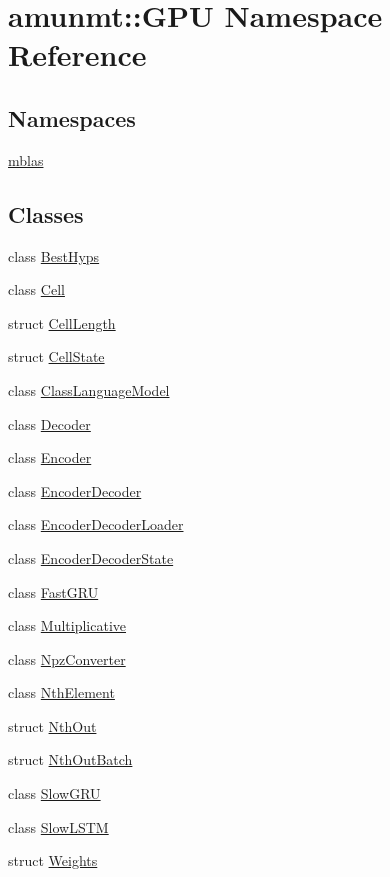 \hypertarget{namespaceamunmt_1_1GPU}{}\section{amunmt\+:\+:G\+PU Namespace Reference}
\label{namespaceamunmt_1_1GPU}
\subsection*{Namespaces}
\begin{DoxyCompactItemize}
\item 
 \hyperlink{namespaceamunmt_1_1GPU_1_1mblas}{mblas}
\end{DoxyCompactItemize}
\subsection*{Classes}
\begin{DoxyCompactItemize}
\item 
class \hyperlink{classamunmt_1_1GPU_1_1BestHyps}{Best\+Hyps}
\item 
class \hyperlink{classamunmt_1_1GPU_1_1Cell}{Cell}
\item 
struct \hyperlink{structamunmt_1_1GPU_1_1CellLength}{Cell\+Length}
\item 
struct \hyperlink{structamunmt_1_1GPU_1_1CellState}{Cell\+State}
\item 
class \hyperlink{classamunmt_1_1GPU_1_1ClassLanguageModel}{Class\+Language\+Model}
\item 
class \hyperlink{classamunmt_1_1GPU_1_1Decoder}{Decoder}
\item 
class \hyperlink{classamunmt_1_1GPU_1_1Encoder}{Encoder}
\item 
class \hyperlink{classamunmt_1_1GPU_1_1EncoderDecoder}{Encoder\+Decoder}
\item 
class \hyperlink{classamunmt_1_1GPU_1_1EncoderDecoderLoader}{Encoder\+Decoder\+Loader}
\item 
class \hyperlink{classamunmt_1_1GPU_1_1EncoderDecoderState}{Encoder\+Decoder\+State}
\item 
class \hyperlink{classamunmt_1_1GPU_1_1FastGRU}{Fast\+G\+RU}
\item 
class \hyperlink{classamunmt_1_1GPU_1_1Multiplicative}{Multiplicative}
\item 
class \hyperlink{classamunmt_1_1GPU_1_1NpzConverter}{Npz\+Converter}
\item 
class \hyperlink{classamunmt_1_1GPU_1_1NthElement}{Nth\+Element}
\item 
struct \hyperlink{structamunmt_1_1GPU_1_1NthOut}{Nth\+Out}
\item 
struct \hyperlink{structamunmt_1_1GPU_1_1NthOutBatch}{Nth\+Out\+Batch}
\item 
class \hyperlink{classamunmt_1_1GPU_1_1SlowGRU}{Slow\+G\+RU}
\item 
class \hyperlink{classamunmt_1_1GPU_1_1SlowLSTM}{Slow\+L\+S\+TM}
\item 
struct \hyperlink{structamunmt_1_1GPU_1_1Weights}{Weights}
\end{DoxyCompactItemize}

